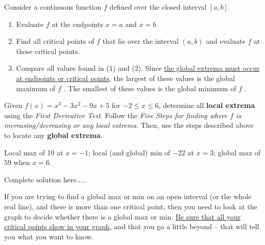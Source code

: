 \begin{tcolorbox}[title={Steps For Locating Global Extrema Over A Closed Interval}]
Consider a continuous function $f$ defined over the closed interval $[a, b]$.
\begin{enumerate}
    \item Evaluate $f$ at the endpoints $x=a$ and $x=b$.
    \item Find all critical points of $f$ that lie over the interval $(a,b)$ and evaluate $f$ at those critical points.
    \item Compare all values found in (1) and (2). Since \underline{the global extrema must occur at endpoints or critical points}, the largest of these values is the global maximum of $f$ . The smallest of these values is the global minimum of $f$ .
\end{enumerate}
\end{tcolorbox}
\newpage
\begin{example}
Given $f(x)=x^3-3x^2-9x+5$ for $-2\le x\le 6$, determine all \textbf{local extrema} using the \emph{First Derivative Test}. Follow the \emph{Five Steps for finding where $f$ is increasing/decreasing or any local extrema}. Then, use the steps described above to locate any \textbf{global extrema}.
    \begin{sol}
    Local max of 10 at $x=-1$; local (and global) min of $-22$ at $x=3$; global max of $59$ when $x=6$.
    \end{sol}
    \begin{solL}
    Complete solution here.....
    
    \end{solL}
    
\end{example}
\newpage
\begin{tcolorbox}[title={Locating Global Extrema Over An Open Interval}]
\noindent If you are trying to find a global max or min on an open interval (or the whole real line), and there is more than one critical point, then you need to look at the graph to decide whether there is a global max or min. \underline{Be sure that all your critical points show in your graph}, and that you go a little beyond – that will tell you what you want to know.
\end{tcolorbox}
